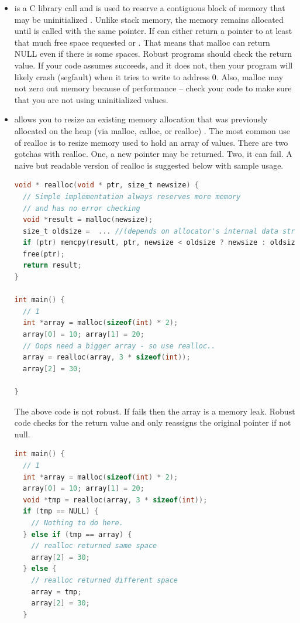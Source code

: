 \begin{itemize}

\item {} is a C library call and is used to reserve a contiguous block of memory that may be uninitialized \cite[P. 348]{jones2010wg14}.
Unlike stack memory, the memory remains allocated until  is called with the same pointer.
If  can either return a pointer to at least that much free space requested or .
That means that malloc can return NULL even if there is some spaces.
Robust programs should check the return value.
If your code assumes  succeeds, and it does not, then your program will likely crash (segfault) when it tries to write to address 0.
Also, malloc may not zero out memory because of performance -- check your code to make sure that you are not using uninitialized values.

\item {} allows you to resize an existing memory allocation that was previously allocated on the heap (via malloc, calloc, or realloc) \cite[P. 349]{jones2010wg14}.
The most common use of realloc is to resize memory used to hold an array of values.
There are two gotchas with realloc.
One, a new pointer may be returned.
Two, it can fail.
A naive but readable version of realloc is suggested below with sample usage.

\begin{lstlisting}[language=C]
void * realloc(void * ptr, size_t newsize) {
  // Simple implementation always reserves more memory
  // and has no error checking
  void *result = malloc(newsize);
  size_t oldsize =  ... //(depends on allocator's internal data structure)
  if (ptr) memcpy(result, ptr, newsize < oldsize ? newsize : oldsize);
  free(ptr);
  return result;
}

int main() {
  // 1
  int *array = malloc(sizeof(int) * 2);
  array[0] = 10; array[1] = 20;
  // Oops need a bigger array - so use realloc..
  array = realloc(array, 3 * sizeof(int));
  array[2] = 30;

}
\end{lstlisting}

The above code is not robust.
If  fails then the array is a memory leak.
Robust code checks for the return value and only reassigns the original pointer if not null.

\begin{lstlisting}[language=C]
int main() {
  // 1
  int *array = malloc(sizeof(int) * 2);
  array[0] = 10; array[1] = 20;
  void *tmp = realloc(array, 3 * sizeof(int));
  if (tmp == NULL) {
    // Nothing to do here.
  } else if (tmp == array) {
    // realloc returned same space
    array[2] = 30;
  } else {
    // realloc returned different space
    array = tmp;
    array[2] = 30;
  }


\end{lstlisting}
\end{itemize}
